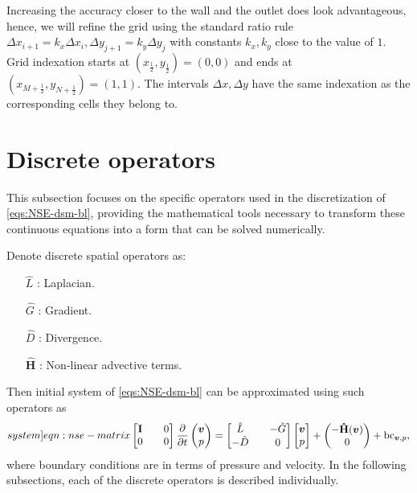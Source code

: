 \documentclass{article}
\numberwithin{equation}{section}
\begin{document}
Increasing the accuracy closer to the wall and the outlet does look advantageous, hence, we will refine the grid using the standard ratio rule $\Delta x_{i+1}=k_x\Delta x_i,\Delta y_{j+1}=k_y\Delta y_j$ with constants $k_x,k_y$ close to the value of $1$. Grid indexation starts at $(x_{\frac{1}{2}},y_{\frac{1}{2}})=(0,0)$ and ends at $(x_{M+\frac{1}{2}},y_{N+\frac{1}{2}})=(1,1)$. The intervals $\Delta x, \Delta y$ have the same indexation as the corresponding cells they belong to. 

\section{Discrete operators}

This subsection focuses on the specific operators used in the discretization of \cref{eqs:NSE-dsm-bl}, providing the mathematical tools necessary to transform these continuous equations into a form that can be solved numerically.

Denote discrete spatial operators as:
\begin{enumerate}
	\item[$\hat{L}$]:  Laplacian.
	\item[$\hat{G}$]: Gradient.
	\item[$\hat{D}$]: Divergence.
	\item[$\mathbf{\hat{H}}$]: Non-linear advective terms.
\end{enumerate}
Then initial system of \cref{eqs:NSE-dsm-bl} can be approximated using such operators as
\begin{equation}\label[system]{eqn:nse-matrix}
            \begin{bmatrix}
                  \mathbf{I} && 0 \\ 
                  0 && 0
            \end{bmatrix}
            \frac{\partial }{\partial t} 
            \begin{pmatrix}
                  \boldsymbol{v} \\ 
                  p
            \end{pmatrix}
            =
            \begin{bmatrix}
                  \hat{L} && - \hat{G} \\ 
                  -\hat{D} && 0
            \end{bmatrix}
            \begin{bmatrix}
                  \boldsymbol{v} \\
                  p
            \end{bmatrix}
            +
            \begin{pmatrix}
                  -\mathbf{\hat{H}}(\boldsymbol{v})\\
                  0
            \end{pmatrix} + \text{bc}_{\boldsymbol{v},p},
        \end{equation}
where boundary conditions are in terms of pressure and velocity. In the following subsections, each of the discrete operators is described individually. 
\end{document}
